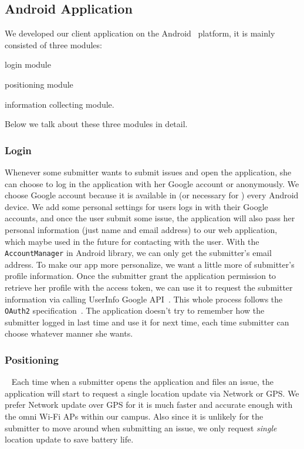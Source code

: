 \documentclass{acm_proc_article-sp}
\begin{document}
\subsection{Android Application}
We developed our client application on the Android~\cite{android} platform,
it is mainly consisted of three modules:
\begin{inparaenum}
 \item login module
 \item positioning module
 \item information collecting module.
 \end{inparaenum}
 Below we talk about these three modules in detail.
 \subsubsection{Login}
 Whenever some submitter wants to submit issues and open the application, she can choose to log in the application with her Google account or anonymously.
 We choose Google account because it is available in (or necessary for ) every Android device. We add some personal settings for users
 logs in with their Google accounts, and once the user submit some issue, the application will also pass her personal information (just name and email address)
 to our web application, which maybe used in the future for contacting with the user. With the \texttt{AccountManager} in Android library, we
 can only get the submitter's email address. To make our app more personalize, we want a little more of submitter's profile information.
 Once the submitter grant the application permission to retrieve her profile with the access token,
 we can use it to request the submitter information via calling UserInfo Google API~\cite{google-user-api}.
 This whole process follows the \texttt{OAuth2} specification~\cite{oauth2}.
 The application doesn't try to remember how the submitter logged in last time and use it for next time,
 each time submitter can choose whatever manner she wants.

\subsubsection{Positioning}~\label{sec:position}
 Each time when a submitter opens the application and files an issue, the application will start to request a single location update via 
 Network or GPS. We prefer Network update over GPS for it is much faster and accurate enough with the omni Wi-Fi APs within our campus.
 Also since it is unlikely for the submitter to move around when submitting an issue, we only request \textit{single} location update 
 to save battery life. \framedots
 
\end{document}
